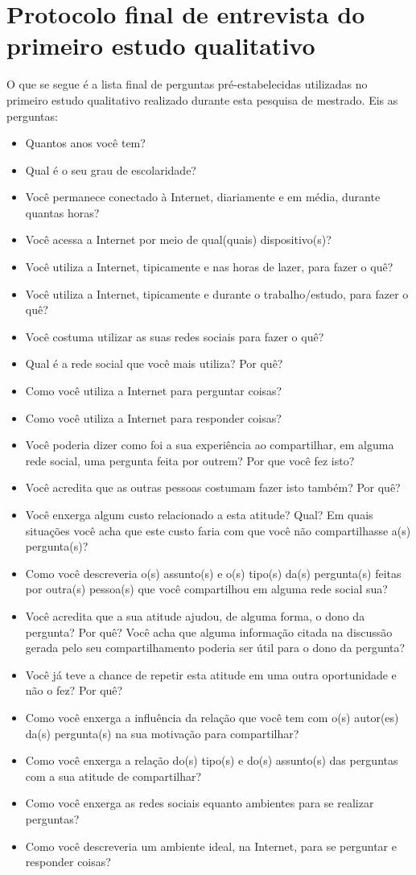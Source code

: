 \chapter{Protocolo final de entrevista do primeiro estudo qualitativo}
O que se segue é a lista final de perguntas pré-estabelecidas utilizadas no primeiro estudo qualitativo realizado durante esta pesquisa de mestrado. Eis as perguntas:
\begin{itemize}
    \item Quantos anos você tem?
    \item Qual é o seu grau de escolaridade?
    \item Você permanece conectado à Internet, diariamente e em média, durante quantas horas?
    \item Você acessa a Internet por meio de qual(quais) dispositivo(s)?
    \item Você utiliza a Internet, tipicamente e nas horas de lazer, para fazer o quê?
    \item Você utiliza a Internet, tipicamente e durante o trabalho/estudo, para fazer o quê?
    \item Você costuma utilizar as suas redes sociais para fazer o quê?
    \item Qual é a rede social que você mais utiliza? Por quê?
    \item Como você utiliza a Internet para perguntar coisas? 
    \item Como você utiliza a Internet para responder coisas?
    \item Você poderia dizer como foi a sua experiência ao compartilhar, em alguma rede social, uma pergunta feita por outrem? Por que você fez isto?
    \item Você acredita que as outras pessoas costumam fazer isto também? Por quê?
    \item Você enxerga algum custo relacionado a esta atitude? Qual? Em quais situações você acha que este custo faria com que você não compartilhasse a(s) pergunta(s)?
    \item Como você descreveria o(s) assunto(s) e o(s) tipo(s) da(s) pergunta(s) feitas por outra(s) pessoa(s) que você compartilhou em alguma rede social sua?
    \item Você acredita que a sua atitude ajudou, de alguma forma, o dono da pergunta? Por quê? Você acha que alguma informação citada na discussão gerada pelo seu compartilhamento poderia ser útil para o dono da pergunta?
    \item Você já teve a chance de repetir esta atitude em uma outra oportunidade e não o fez? Por quê?
    \item Como você enxerga a influência da relação que você tem com o(s) autor(es) da(s) pergunta(s) na sua motivação para compartilhar?
    \item Como você enxerga a relação do(s) tipo(s) e do(s) assunto(s) das perguntas com a sua atitude de compartilhar?
    \item Como você enxerga as redes sociais equanto ambientes para se realizar perguntas?
    \item Como você descreveria um ambiente ideal, na Internet, para se perguntar e responder coisas?
\end{itemize}

